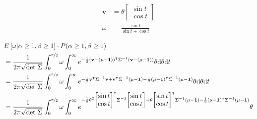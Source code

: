 \documentclass{article}
\begin{document}
\begin{equation*}
  \begin{aligned}
    \mathbf{v} &= \theta \left[ \begin{matrix} \sin t \\ \cos t \end{matrix} \right] \\
    \omega &= \frac{\sin t}{\sin t+\cos t} \\
  \end{aligned}
\end{equation*}
\begin{equation*}
  \begin{aligned}
    & E\left[ \omega | \alpha\ge 1, \beta\ge 1 \right] \cdot P(\alpha\ge 1, \beta\ge 1) \\
    &=
    \frac{1}{2\pi \sqrt{\text{det }\Sigma}}
    \int_0^{\nicefrac{\pi}{2}}
    \omega
    \int_0^\infty
    e^{-\frac{1}{2}(\mathbf{v}-(\mathbf{\mu}-\mathbf{1}))^\intercal \Sigma^{-1} (\mathbf{v}-(\mathbf{\mu}-\mathbf{1}))}
    \theta
    \text{d}\theta
    \text{d}t
    \\
    &=
    \frac{1}{2\pi \sqrt{\text{det }\Sigma}}
    \int_0^{\nicefrac{\pi}{2}}
    \omega
    \int_0^\infty
    e^{
      -\frac{1}{2} \mathbf{v}^\intercal \Sigma^{-1} \mathbf{v}
      + \mathbf{v}^\intercal \Sigma^{-1} (\mathbf{\mu}-\mathbf{1})
      -\frac{1}{2}(\mathbf{\mu}-\mathbf{1})^\intercal \Sigma^{-1} (\mathbf{\mu}-\mathbf{1})
    }
    \theta
    \text{d}\theta
    \text{d}t
    \\
    &=
    \frac{1}{2\pi \sqrt{\text{det }\Sigma}}
    \int_0^{\nicefrac{\pi}{2}}
    \omega
    \int_0^\infty
    e^{
      -\frac{1}{2}\theta^2 \left[\begin{matrix} \sin t \\ \cos t \end{matrix}\right]^\intercal
      \Sigma^{-1}
      \left[\begin{matrix} \sin t \\ \cos t \end{matrix}\right]
      + \theta \left[\begin{matrix} \sin t \\ \cos t \end{matrix}\right]^\intercal
      \Sigma^{-1} (\mathbf{\mu}-\mathbf{1})
      -\frac{1}{2} (\mathbf{\mu}-\mathbf{1})^\intercal \Sigma^{-1} (\mathbf{\mu}-\mathbf{1})
    }
    \theta

\end{aligned}
\end{equation*}
\end{document}
